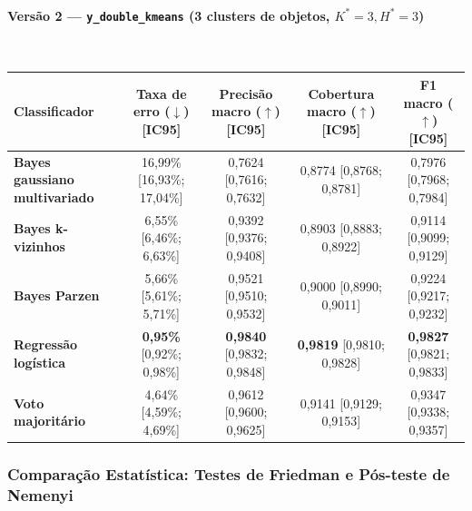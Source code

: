 \documentclass[a4paper,11pt]{article}
\begin{document}
\paragraph{\texorpdfstring{Versão 2 --- \texttt{y\_double\_kmeans} (3 clusters de objetos, $K^* = 3, H^* = 3$)}{Versão 2 - ydoublekmeans (3 clusters de objetos, K^ = 3, H^ = 3)}}\mbox{}\\[-0.2em]\label{sec:versao-2-ydoublekmeans-3-clusters-de-objetos-k-3-h-3}


\begin{center}
\begin{minipage}{\linewidth}
\centering
{}
\footnotesize
\sloppy
\setlength{\tabcolsep}{2.5pt}
\renewcommand{\arraystretch}{1.18}
\begin{tabularx}{\linewidth}{P{2.55cm} C C C C}
\toprule
\textbf{Classificador} & \textbf{Taxa de erro ($\downarrow$) [IC95]} & \textbf{Precisão macro ($\uparrow$) [IC95]} & \textbf{Cobertura macro ($\uparrow$) [IC95]} & \textbf{F1 macro ($\uparrow$) [IC95]} \\
\midrule
\textbf{Bayes gaussiano multivariado} & 16,99\% [16,93\%; 17,04\%] & 0,7624 [0,7616; 0,7632] & 0,8774 [0,8768; 0,8781] & 0,7976 [0,7968; 0,7984] \\
\textbf{Bayes k-vizinhos} & 6,55\% [6,46\%; 6,63\%] & 0,9392 [0,9376; 0,9408] & 0,8903 [0,8883; 0,8922] & 0,9114 [0,9099; 0,9129] \\
\textbf{Bayes Parzen} & 5,66\% [5,61\%; 5,71\%] & 0,9521 [0,9510; 0,9532] & 0,9000 [0,8990; 0,9011] & 0,9224 [0,9217; 0,9232] \\
\textbf{Regressão logística} & \textbf{0,95\%} [0,92\%; 0,98\%] & \textbf{0,9840} [0,9832; 0,9848] & \textbf{0,9819} [0,9810; 0,9828] & \textbf{0,9827} [0,9821; 0,9833] \\
\textbf{Voto majoritário} & 4,64\% [4,59\%; 4,69\%] & 0,9612 [0,9600; 0,9625] & 0,9141 [0,9129; 0,9153] & 0,9347 [0,9338; 0,9357] \\
\bottomrule
\end{tabularx}
\end{minipage}
\end{center}


\subsubsection{Comparação Estatística: Testes de Friedman e Pós-teste de Nemenyi}\label{sec:2-3-4-comparacao-estatistica-testes-de-friedman-e-pos-teste-de-nemenyi}
\end{document}
